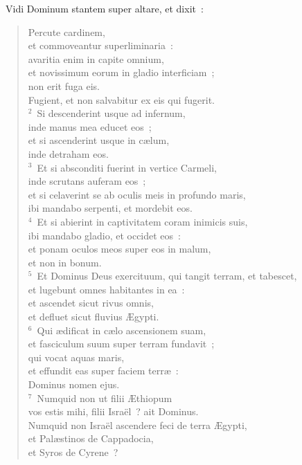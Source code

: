 ~\lettrine[lines=10,image=true,loversize=0.05,lraise=-0.03]{V}{}idi Dominum stantem super altare, et dixit~: \begin{flushleft}\begin{verse}\vspace{6pt}Percute cardinem,\\ et commoveantur superliminaria~:\\ avaritia enim in capite omnium,\\ et novissimum eorum in gladio interficiam~;\\ non erit fuga eis.\\ Fugient, et non salvabitur ex eis qui fugerit.\\
${}^{2}$~Si descenderint usque ad infernum,\\ inde manus mea educet eos~;\\ et si ascenderint usque in c\ae lum,\\ inde detraham eos.\\
${}^{3}$~Et si absconditi fuerint in vertice Carmeli,\\ inde scrutans auferam eos~;\\ et si celaverint se ab oculis meis in profundo maris,\\ ibi mandabo serpenti, et mordebit eos.\\
${}^{4}$~Et si abierint in captivitatem coram inimicis suis,\\ ibi mandabo gladio, et occidet eos~:\\ et ponam oculos meos super eos in malum,\\ et non in bonum.\\
${}^{5}$~Et Dominus Deus exercituum, qui tangit terram, et tabescet,\\ et lugebunt omnes habitantes in ea~:\\ et ascendet sicut rivus omnis,\\ et defluet sicut fluvius \AE gypti.\\
${}^{6}$~Qui \ae dificat in c\ae lo ascensionem suam,\\ et fasciculum suum super terram fundavit~;\\ qui vocat aquas maris,\\ et effundit eas super faciem terr\ae~:\\ Dominus nomen ejus.\\
${}^{7}$~Numquid non ut filii \AE thiopum\\ vos estis mihi, filii Isra\"el~? ait Dominus.\\ Numquid non Isra\"el ascendere feci de terra \AE gypti,\\ et Pal\ae stinos de Cappadocia,\\ et Syros de Cyrene~?\end{verse}\end{flushleft}


